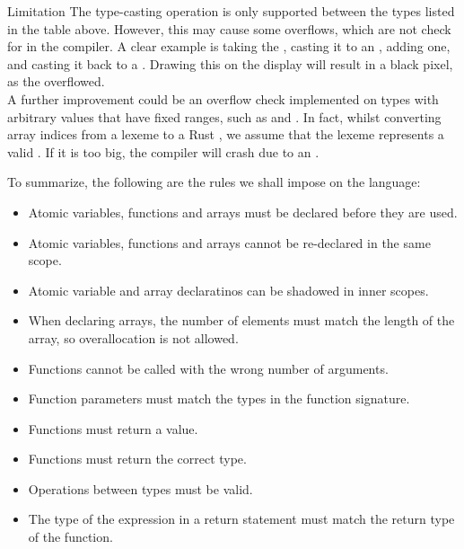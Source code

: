 \begin{warningbox}{Limitation}
    The type-casting operation is only supported
    between the types listed in the table above. However, this may cause some
    overflows, which are not check for in the compiler. A clear example is taking
    the  , casting it to an , adding one, and casting it back to a . Drawing this on the display will result in a black pixel, as the  overflowed.\\

    A further improvement could be an overflow check implemented on types with arbitrary values that have fixed ranges, such as  and .
    In fact, whilst converting array indices from a lexeme to a Rust , we assume that the lexeme represents a valid . If it is too big, the compiler will crash due to an .
\end{warningbox}

To summarize, the following are the rules we shall impose on the language:

\begin{itemize}
    \item Atomic variables, functions and arrays must be declared before they are used.
    \item Atomic variables, functions and arrays cannot be re-declared in the same scope.
    \item Atomic variable and array declaratinos can be shadowed in inner scopes.
    \item When declaring arrays, the number of elements must match the length of
          the array, so overallocation is not allowed.
    \item Functions cannot be called with the wrong number of arguments.
    \item Function parameters must match the types in the function signature.
    \item Functions must return a value.
    \item Functions must return the correct type.
    \item Operations between types must be valid.
    \item The type of the expression in a return statement must match the return type of the function.
\end{itemize}
